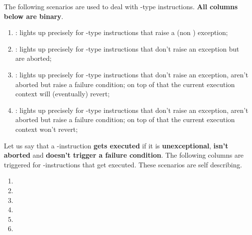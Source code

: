 The following scenarios are used to deal with -type instructions. \textbf{All columns below are binary}.
\begin{enumerate}[resume]
	\item \scenCreateException:
		lights up precisely for -type instructions that raise a (non \staticxSH{}) exception;
	\item \scenCreateAbort:
		lights up precisely for -type instructions that don't raise an exception but are aborted;
	\item \scenCreateFCondWillRevert:
		lights up precisely for -type instructions that don't raise an exception, aren't aborted but raise a failure condition;
		on top of that the current execution context will (eventually) revert; 
	\item \scenCreateFCondWontRevert:
		lights up precisely for -type instructions that don't raise an exception, aren't aborted but raise a failure condition;
		on top of that the current execution context won't revert; 
\end{enumerate}
Let us say that a -instruction
\textbf{gets executed}\label{hub: instruction handling: create: definition of 'get executed'}
if it is \textbf{unexceptional}, \textbf{isn't aborted} and \textbf{doesn't trigger a failure condition}. 
The following columns are triggered for -instructions that get executed. These scenarios are self describing. 
\begin{enumerate}[resume]
	\item \scenCreateEmptyInitCodeWontRevert{}
	\item \scenCreateEmptyInitCodeWillRevert{}
	\item \scenCreateNonEmptyInitCodeFailureWontRevert{}
	\item \scenCreateNonEmptyInitCodeFailureWillRevert{}
	\item \scenCreateNonEmptyInitCodeSuccessWontRevert{}
	\item \scenCreateNonEmptyInitCodeSuccessWillRevert{}
\end{enumerate}

